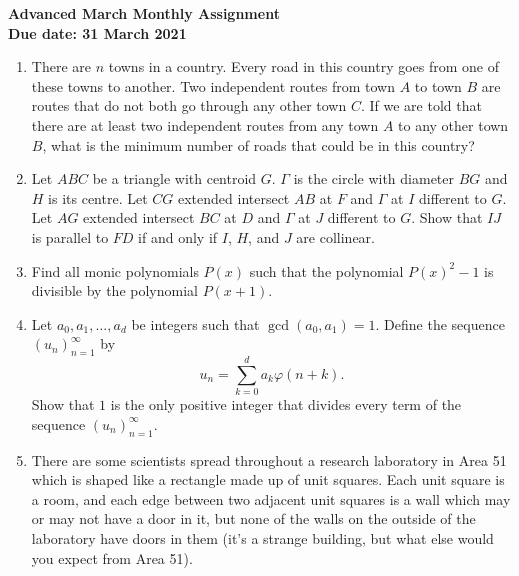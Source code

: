 \documentclass{article}
\begin{document}
\thispagestyle{empty}

\begin{center}
  \textbf{\Large Advanced March Monthly Assignment}
  \\ \vspace{1em}
  \textbf{\large Due date: 31 March 2021}
\end{center}

\vfill
\vfill

\begin{enumerate}[1.]

\vfill
\item %
There are $n$ towns in a country.
Every road in this country goes from one of these towns to another.
Two independent routes from town $A$ to town $B$ are routes that do not both go through any other town $C$.
If we are told that there are at least two independent routes from any town $A$ to any other town $B$, what is the minimum number of roads that could be in this country?


\vfill
\item %
Let $ABC$ be a triangle with centroid $G$.
$\Gamma$ is the circle with diameter $BG$ and $H$ is its centre.
Let $CG$ extended intersect $AB$ at $F$ and $\Gamma$ at $I$ different to $G$.
Let $AG$ extended intersect $BC$ at $D$ and $\Gamma$ at $J$ different to $G$. Show that $IJ$ is parallel to $FD$ if and only if $I$, $H$, and $J$ are collinear.


\vfill
\item %
Find all monic polynomials $P(x)$ such that the polynomial $P(x)^2-1$ is divisible by the polynomial $P(x+1)$.


\vfill
\item %
Let $a_0, a_1, \dots, a_d$ be integers such that $\gcd(a_0, a_1) = 1$. Define the sequence $(u_n)_{n=1}^{\infty}$ by
\[
  u_n = \sum_{k = 0}^{d} a_k \varphi(n + k).
\]
Show that $1$ is the only positive integer that divides every term of the sequence $(u_n)_{n = 1}^{\infty}$.


\vfill
\item %
There are some scientists spread throughout a research laboratory in Area 51 which is shaped like a rectangle made up of unit squares.
Each unit square is a room, and each edge between two adjacent unit squares is a wall which may or may not have a door in it, but none of the walls on the outside of the laboratory have doors in them (it's a strange building, but what else would you expect from Area 51).


\end{enumerate}
\end{document}
